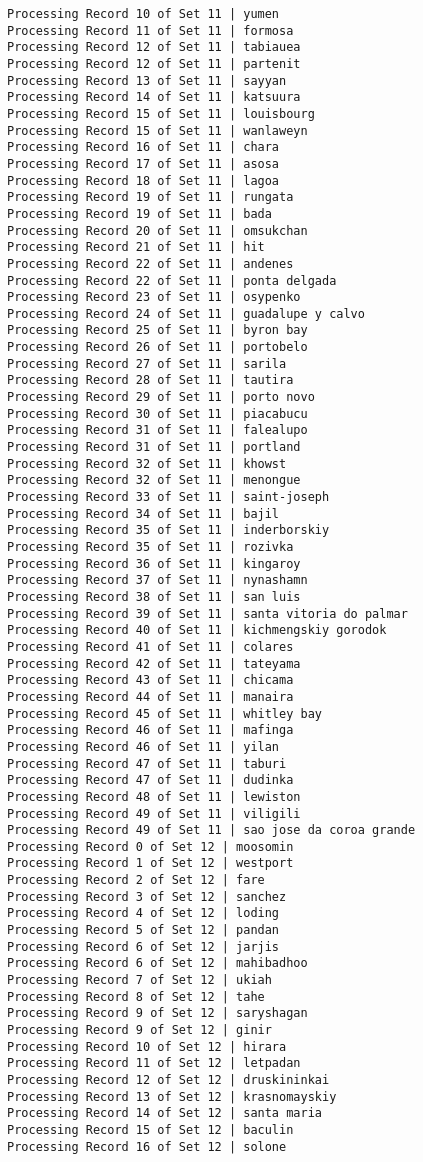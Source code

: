 \documentclass[11pt]{article}
\begin{document}
\begin{Verbatim}[commandchars=\\\{\}]
Processing Record 10 of Set 11 | yumen
Processing Record 11 of Set 11 | formosa
Processing Record 12 of Set 11 | tabiauea
Processing Record 12 of Set 11 | partenit
Processing Record 13 of Set 11 | sayyan
Processing Record 14 of Set 11 | katsuura
Processing Record 15 of Set 11 | louisbourg
Processing Record 15 of Set 11 | wanlaweyn
Processing Record 16 of Set 11 | chara
Processing Record 17 of Set 11 | asosa
Processing Record 18 of Set 11 | lagoa
Processing Record 19 of Set 11 | rungata
Processing Record 19 of Set 11 | bada
Processing Record 20 of Set 11 | omsukchan
Processing Record 21 of Set 11 | hit
Processing Record 22 of Set 11 | andenes
Processing Record 22 of Set 11 | ponta delgada
Processing Record 23 of Set 11 | osypenko
Processing Record 24 of Set 11 | guadalupe y calvo
Processing Record 25 of Set 11 | byron bay
Processing Record 26 of Set 11 | portobelo
Processing Record 27 of Set 11 | sarila
Processing Record 28 of Set 11 | tautira
Processing Record 29 of Set 11 | porto novo
Processing Record 30 of Set 11 | piacabucu
Processing Record 31 of Set 11 | falealupo
Processing Record 31 of Set 11 | portland
Processing Record 32 of Set 11 | khowst
Processing Record 32 of Set 11 | menongue
Processing Record 33 of Set 11 | saint-joseph
Processing Record 34 of Set 11 | bajil
Processing Record 35 of Set 11 | inderborskiy
Processing Record 35 of Set 11 | rozivka
Processing Record 36 of Set 11 | kingaroy
Processing Record 37 of Set 11 | nynashamn
Processing Record 38 of Set 11 | san luis
Processing Record 39 of Set 11 | santa vitoria do palmar
Processing Record 40 of Set 11 | kichmengskiy gorodok
Processing Record 41 of Set 11 | colares
Processing Record 42 of Set 11 | tateyama
Processing Record 43 of Set 11 | chicama
Processing Record 44 of Set 11 | manaira
Processing Record 45 of Set 11 | whitley bay
Processing Record 46 of Set 11 | mafinga
Processing Record 46 of Set 11 | yilan
Processing Record 47 of Set 11 | taburi
Processing Record 47 of Set 11 | dudinka
Processing Record 48 of Set 11 | lewiston
Processing Record 49 of Set 11 | viligili
Processing Record 49 of Set 11 | sao jose da coroa grande
Processing Record 0 of Set 12 | moosomin
Processing Record 1 of Set 12 | westport
Processing Record 2 of Set 12 | fare
Processing Record 3 of Set 12 | sanchez
Processing Record 4 of Set 12 | loding
Processing Record 5 of Set 12 | pandan
Processing Record 6 of Set 12 | jarjis
Processing Record 6 of Set 12 | mahibadhoo
Processing Record 7 of Set 12 | ukiah
Processing Record 8 of Set 12 | tahe
Processing Record 9 of Set 12 | saryshagan
Processing Record 9 of Set 12 | ginir
Processing Record 10 of Set 12 | hirara
Processing Record 11 of Set 12 | letpadan
Processing Record 12 of Set 12 | druskininkai
Processing Record 13 of Set 12 | krasnomayskiy
Processing Record 14 of Set 12 | santa maria
Processing Record 15 of Set 12 | baculin
Processing Record 16 of Set 12 | solone

    \end{Verbatim}
\end{document}
